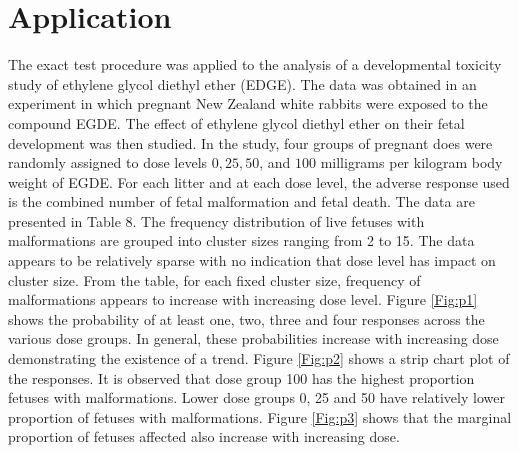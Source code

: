 \documentclass[12pt,oneside]{report}
\theoremstyle{definition}
\theoremstyle{mystyle}
\begin{document}
\section{Application }
The exact test procedure was applied to the analysis of a developmental toxicity study of ethylene glycol diethyl ether (EDGE). The data was obtained in an experiment
 in which pregnant New Zealand white rabbits were exposed to the compound EGDE. The effect of ethylene glycol diethyl ether on their  fetal development  was then studied. In the study, four groups of pregnant does were randomly assigned to dose levels $0, 25, 50$, and $100$ milligrams per kilogram body weight of EGDE. For each litter and at each dose level, the adverse response used is the combined number of fetal malformation and fetal death.
The data are presented in  Table 8. The frequency distribution  of live fetuses with malformations are grouped into cluster sizes ranging from 2 to 15. The data appears to be relatively sparse with no indication that dose level has impact on cluster size. From the table, for each fixed cluster size, frequency of malformations  appears to increase with increasing dose level. Figure \ref{Fig:p1} shows the probability of at least one, two, three and four responses across the various dose groups. In general, these probabilities increase with increasing dose demonstrating  the existence of a trend. Figure \ref{Fig:p2} shows a strip chart plot of the responses. It is observed that dose group 100 has the highest proportion fetuses with malformations. Lower dose groups 0, 25 and 50 have relatively lower proportion of fetuses with malformations. Figure \ref{Fig:p3} shows that the marginal proportion of fetuses affected also increase with increasing dose.
\end{document}
